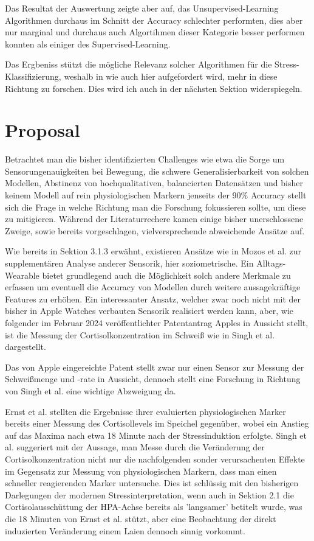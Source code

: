 Das Resultat der Auswertung zeigte aber auf, das Unsupervised-Learning Algorithmen durchaus im Schnitt der Accuracy schlechter performten, dies aber nur marginal und durchaus auch Algortihmen dieser Kategorie
besser performen konnten als einiger des Supervised-Learning.

Das Ergbeniss stützt die mögliche Relevanz solcher Algorithmen für die Stress-Klassifizierung, weshalb in \cite{Iqbal2022} wie auch hier aufgefordert wird, mehr in diese Richtung zu forschen. Dies wird ich auch in der nächsten Sektion widerspiegeln.


\section{Proposal}
Betrachtet man die bisher identifizierten Challenges wie etwa die Sorge um Sensorungenauigkeiten bei Bewegung, die schwere Generalisierbarkeit von solchen Modellen, 
Abstinenz von hochqualitativen, balancierten Datensätzen und bisher keinem Modell auf rein physiologischen Markern jenseits der 90\% Accuracy stellt sich die Frage 
in welche Richtung man die Forschung fokussieren sollte, um diese zu mitigieren. Während der Literaturrechere kamen einige bisher unerschlossene Zweige, sowie bereits vorgeschlagen, vielversprechende
abweichende Ansätze auf. 

Wie bereits in Sektion 3.1.3 erwähnt, existieren Ansätze wie in Mozos et al. zur supplementären Analyse anderer Sensorik, hier soziometrische. Ein Alltags-Wearable bietet grundlegend auch die 
Möglichkeit solch andere Merkmale zu erfassen um eventuell die Accuracy von Modellen durch weitere aussagekräftige Features zu erhöhen. Ein interessanter Ansatz, welcher zwar noch nicht mit der bisher in Apple Watches verbauten 
Sensorik realisiert werden kann, aber, wie folgender im Februar 2024 veröffentlichter Patentantrag Apples \cite{Kim2024} in Aussicht stellt, ist die Messung der Cortisolkonzentration im Schweiß wie in Singh et al. \cite{Singh2023} dargestellt.

Das von Apple eingereichte Patent stellt zwar nur einen Sensor zur Messung der Schweißmenge und -rate in Aussicht, dennoch stellt eine Forschung in Richtung von Singh et al. eine wichtige Abzweigung da.

Ernst et al. stellten die Ergebnisse ihrer evaluierten physiologischen Marker bereits einer Messung des Cortisollevels im Speichel gegenüber, wobei ein Anstieg auf das Maxima nach etwa 18 Minute nach der Stressinduktion erfolgte. \cite{Ernst2023} 
Singh et al. suggeriert mit der Aussage, man Messe durch die Veränderung der Cortisolkonzentration nicht nur die nachfolgenden sonder verursachenten Effekte im Gegensatz zur Messung von physiologischen Markern, dass man einen schneller reagierenden Marker untersuche. 
Dies ist schlüssig mit den bisherigen Darlegungen der modernen Stressinterpretation, wenn auch in Sektion 2.1 die Cortisolausschüttung der \ac{HPA-Achse} bereits als 'langsamer' betitelt wurde, was die 18 Minuten von Ernst et al. stützt, aber eine Beobachtung der direkt induzierten Veränderung einem Laien dennoch sinnig vorkommt.

